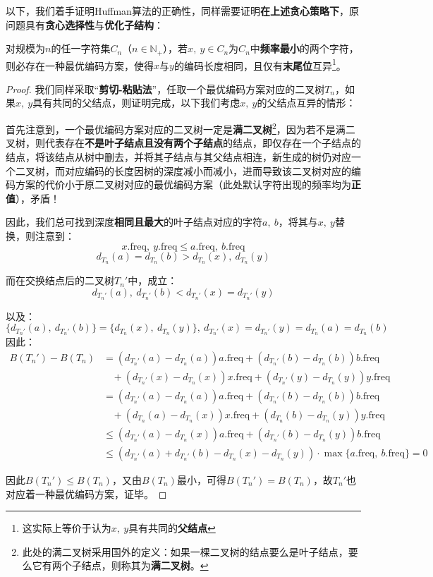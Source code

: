 \documentclass[12pt,a4paper,violet,oneside]{bbe}
\begin{document}
以下，我们着手证明Huffman算法的正确性，同样需要证明\textbf{在上述贪心策略下}，原问题具有\textbf{贪心选择性}与\textbf{优化子结构}：
\begin{lemma}
	对规模为$n$的任一字符集$C_n$（$n\in\mathbb{N}_+$），若$x,~y\in C_n$为$C_n$中\textbf{频率最小}的两个字符，则必存在一种最优编码方案，使得$x$与$y$的编码长度相同，且仅有\textbf{末尾位}互异\footnote{这实际上等价于认为$x,~y$具有共同的\textbf{父结点}}。
\end{lemma}
\begin{proof}
	我们同样采取“\textbf{剪切-粘贴法}”，任取一个最优编码方案对应的二叉树$T_n$，如果$x,~y$具有共同的父结点，则证明完成，以下我们考虑$x,~y$的父结点互异的情形：
	
	首先注意到，一个最优编码方案对应的二叉树一定是\textbf{满二叉树}\footnote{此处的满二叉树采用国外的定义：如果一棵二叉树的结点要么是叶子结点，要么它有两个子结点，则称其为\textbf{满二叉树}。}，因为若不是满二叉树，则代表存在\textbf{不是叶子结点且没有两个子结点}的结点，即仅存在一个子结点的结点，将该结点从树中删去，并将其子结点与其父结点相连，新生成的树仍对应一个二叉树，而对应编码的长度因树的深度减小而减小，进而导致该二叉树对应的编码方案的代价小于原二叉树对应的最优编码方案（此处默认字符出现的频率均为\textbf{正值}），矛盾！
	
	因此，我们总可找到深度\textbf{相同且最大}的叶子结点对应的字符$a,~b$，将其与$x,~y$替换，则注意到：
	$$
	x.\text{freq},~y.\text{freq}\leqslant a.\text{freq},~b.\text{freq}
	$$
	$$
	d_{T_n}(a)=d_{T_n}(b)>d_{T_n}(x),~d_{T_n}(y)
	$$
	
	而在交换结点后的二叉树$T_n'$中，成立：
	$$
	d_{T_n'}(a),~d_{T_n'}(b)<d_{T_n'}(x)=d_{T_n'}(y)
	$$
	
	以及：
	$$
	\{d_{T_n'}(a),~d_{T_n'}(b)\}=\{d_{T_n}(x),~d_{T_n}(y)\},~d_{T_n'}(x)=d_{T_n'}(y)=d_{T_n}(a)=d_{T_n}(b)
	$$
	因此：
	$$
	\begin{array}{rl}
		B(T_n')-B(T_n)&=(d_{T_n'}(a)-d_{T_n}(a))a.\text{freq}+(d_{T_n'}(b)-d_{T_n}(b))b.\text{freq}\\
		&~~~~+(d_{T_n'}(x)-d_{T_n}(x))x.\text{freq}+(d_{T_n'}(y)-d_{T_n}(y))y.\text{freq}\\
		&=(d_{T_n'}(a)-d_{T_n}(a))a.\text{freq}+(d_{T_n'}(b)-d_{T_n}(b))b.\text{freq}\\
		&~~~~+(d_{T_n}(a)-d_{T_n}(x))x.\text{freq}+(d_{T_n}(b)-d_{T_n}(y))y.\text{freq}\\
		&\leqslant(d_{T_n'}(a)-d_{T_n}(x))a.\text{freq}+(d_{T_n'}(b)-d_{T_n}(y))b.\text{freq}\\
		&\leqslant(d_{T_n'}(a)+d_{T_n'}(b)-d_{T_n}(x)-d_{T_n}(y))\cdot\max\{a.\text{freq},~b.\text{freq}\}=0
	\end{array}
	$$
	
	因此$B(T_n')\leqslant B(T_n)$，又由$B(T_n)$最小，可得$B(T_n')=B(T_n)$，故$T_n'$也对应着一种最优编码方案，证毕。
\end{proof}
\end{document}
